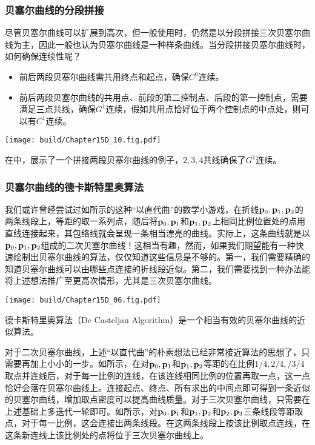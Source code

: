 \subsubsection{贝塞尔曲线的分段拼接}
尽管贝塞尔曲线可以扩展到高次，但一般使用时，仍然是以分段拼接三次贝塞尔曲线为主，因此一般也认为贝塞尔曲线是一种样条曲线。当分段拼接贝塞尔曲线时，如何确保连续性呢？
\begin{itemize}
    \item 前后两段贝塞尔曲线需共用终点和起点，确保$C^0$连续。
    \item 前后两段贝塞尔曲线的共用点、前段的第二控制点、后段的第一控制点，需要满足三点共线，确保$G^1$连续，假如共用点恰好位于两个控制点的中点处，则可以有$C^1$连续。
\end{itemize}

\begin{Figure}[贝塞尔曲线的分段拼接]
    \texttt{[image: build/Chapter15D\_10.fig.pdf]}
\end{Figure}

在中，展示了一个拼接两段贝塞尔曲线的例子，$2,3,4$共线确保了$G^1$连续。

\subsubsection{贝塞尔曲线的德卡斯特里奥算法}

我们或许曾经尝试过如所示的这种“以直代曲”的数学小游戏，在折线$\vb{p}_0,\vb{p}_1,\vb{p}_2$的两条线段上，等距的取一系列点，随后将$\vb{p}_0,\vb{p}_1$和$\vb{p}_1,\vb{p}_2$上相同比例位置处的点用直线连接起来，其包络线就会呈现一条相当漂亮的曲线。实际上，这条曲线就是以$\vb{p}_0,\vb{p}_1,\vb{p}_2$组成的二次贝塞尔曲线！这相当有趣，然而，如果我们期望能有一种快速绘制出贝塞尔曲线的算法，仅仅知道这些信息是不够的。第一，我们需要精确的知道贝塞尔曲线可以由哪些点连接的折线段近似。第二，我们需要找到一种办法能将上述想法推广至更高次情形，尤其是三次贝塞尔曲线。

\begin{Figure}
    \texttt{[image: build/Chapter15D\_06.fig.pdf]}
\end{Figure}

德卡斯特里奥算法（De Casteljau Algorithm）是一个相当有效的贝塞尔曲线的近似算法。

对于二次贝塞尔曲线，上述“以直代曲”的朴素想法已经非常接近算法的思想了，只需要再加上小小的一步。如所示，在对$\vb{p}_0,\vb{p}_1$和$\vb{p}_1,\vb{p}_2$等距的在比例$1/4,2/4,/3/4$取点并连线后，对于每一比例的连线，在该连线相同比例的位置再取一点，这一点恰好会落在贝塞尔曲线上。连接起点、终点、所有求出的中间点即可得到一条近似的贝塞尔曲线，增加取点密度可以提高曲线质量。对于三次贝塞尔曲线，只需要在上述基础上多迭代一轮即可。如所示，对$\vb{p}_0,\vb{p}_1$和$\vb{p}_1,\vb{p}_2$和$\vb{p}_2,\vb{p}_3$三条线段等距取点，对于每一比例，这会连接出两条线段。在这两条线段上按该比例取点连线，在这条新连线上该比例处的点将位于三次贝塞尔曲线上。

